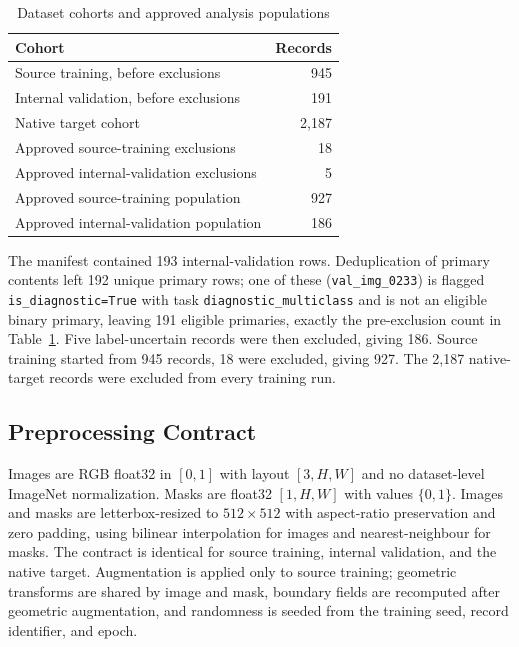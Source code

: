 \documentclass[conference]{IEEEtran}
\begin{document}
\begin{table}[!t]
\centering
\caption{Dataset cohorts and approved analysis populations}
\label{tab:cohorts}
\begin{tabular}{@{}lr@{}}
\toprule
Cohort & Records \\
\midrule
Source training, before exclusions & 945 \\
Internal validation, before exclusions & 191 \\
Native target cohort & 2,187 \\
\midrule
Approved source-training exclusions & 18 \\
Approved internal-validation exclusions & 5 \\
\midrule
Approved source-training population & 927 \\
Approved internal-validation population & 186 \\
\bottomrule
\end{tabular}
\end{table}

The manifest contained 193 internal-validation rows. Deduplication of primary contents left 192 unique primary rows; one of these (\texttt{val\_img\_0233}) is flagged \texttt{is\_diagnostic=True} with task \texttt{diagnostic\_multiclass} and is not an eligible binary primary, leaving 191 eligible primaries, exactly the pre-exclusion count in Table~\ref{tab:cohorts}. Five label-uncertain records were then excluded, giving 186. Source training started from 945 records, 18 were excluded, giving 927. The 2,187 native-target records were excluded from every training run.

\subsection{Preprocessing Contract}

Images are RGB float32 in $[0,1]$ with layout $[3,H,W]$ and no dataset-level ImageNet normalization. Masks are float32 $[1,H,W]$ with values $\{0,1\}$. Images and masks are letterbox-resized to $512\times512$ with aspect-ratio preservation and zero padding, using bilinear interpolation for images and nearest-neighbour for masks. The contract is identical for source training, internal validation, and the native target. Augmentation is applied only to source training; geometric transforms are shared by image and mask, boundary fields are recomputed after geometric augmentation, and randomness is seeded from the training seed, record identifier, and epoch.
\end{document}

